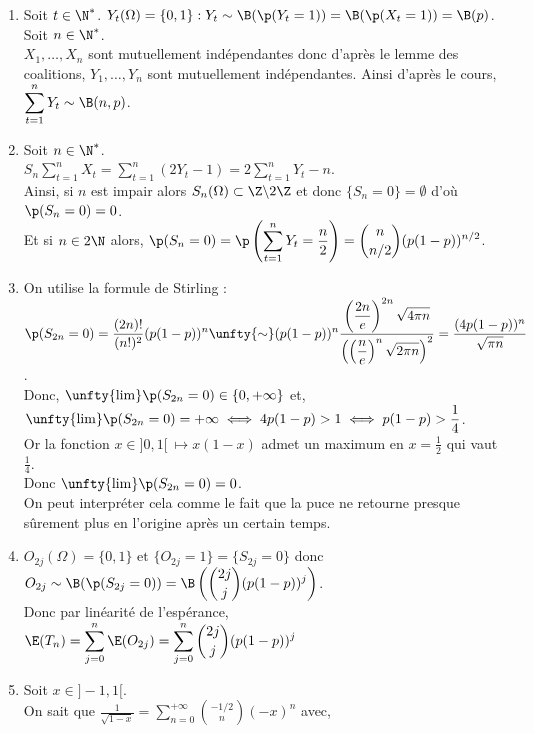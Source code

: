 \documentclass[8pt]{book}
\begin{document}
	\begin{enumerate}
		\item Soit $t\in\N^*$. $Y_t(\Omega)=\{0,1\} : Y_t\sim\B(\p(Y_t=1))=\B(\p(X_t=1))=\B(p)$.\\
		Soit $n\in \N^*$.\\
		$X_1,\dots,X_n$ sont mutuellement indépendantes donc d'après le lemme des coalitions, $Y_1,\dots,Y_n$ sont mutuellement indépendantes. Ainsi d'après le cours, $\displaystyle\sum\limits_{t=1}^nY_t\sim\B(n,p)$.
		\item Soit $n\in \N^*$.\\
		$S_n\displaystyle\sum_{t=1}^nX_t=\sum\limits_{t=1}^n(2Y_t-1)=2\sum\limits_{t=1}^nY_t-n$.\\
		Ainsi, si $n$ est impair alors $S_n(\Omega)\subset \Z\backslash 2\Z$ et donc $\{S_n=0\}=\emptyset$ d'où $\p(S_n=0)=0$.\\
		Et si $n\in 2\N$ alors, $\p(S_n=0)=\displaystyle\p\left(\sum\limits_{t=1}^nY_t=\frac{n}{2}\right)=\binom{n}{n/2}(p(1-p))^{n/2}$.
		\item On utilise la formule de Stirling :\\
		$\p(S_{2n}=0)=\displaystyle\frac{(2n)!}{(n!)^2}(p(1-p))^n\unfty{\sim}(p(1-p))^n\frac{\displaystyle\left(\frac{2n}{e}\right)^{2n}\displaystyle\sqrt{4\pi n}}{\displaystyle\left(\left(\frac{n}{e}\right)^n\displaystyle\sqrt{2\pi n}\right)^2}=\frac{(4p(1-p))^n}{\displaystyle\sqrt{\pi n}}$.\\
		Donc, $\unfty{\lim}\p(S_{2n}=0)\in \{0,+\infty\}$ et,\\
		$\unfty{\lim}\p(S_{2n}=0)=+\infty\iff 4p(1-p)>1\iff p(1-p)>\displaystyle\frac{1}{4}$.\\
		Or la fonction $x\in ]0,1[\ \mapsto x(1-x)$ admet un maximum en $x=\displaystyle\frac{1}{2}$ qui vaut $\displaystyle\frac{1}{4}$.\\
		Donc $\unfty{\lim}\p(S_{2n}=0)=0$.\\
		On peut interpréter cela comme le fait que la puce ne retourne presque sûrement plus en l'origine après un certain temps.
		\item $O_{2j}(\Omega)=\{0,1\}\text{ et }\{O_{2j}=1\}=\{S_{2j}=0\}$ donc $O_{2j}\sim\B(\p(S_{2j}=0))=\B\left(\displaystyle\binom{2j}{j}(p(1-p))^j\right)$.\\
		Donc par linéarité de l'espérance, $\E(T_n)=\displaystyle\sum\limits_{j=0}^n\E(O_{2j})=\sum\limits_{j=0}^n\binom{2j}{j}(p(1-p))^j$
		\item Soit $x\in ]-1,1[$.\\
		On sait que $\displaystyle\frac{1}{\displaystyle\sqrt{1-x}}=\sum\limits_{n=0}^{+\infty}\binom{-1/2}{n}(-x)^n$ avec,\\

\end{enumerate}
\end{document}
